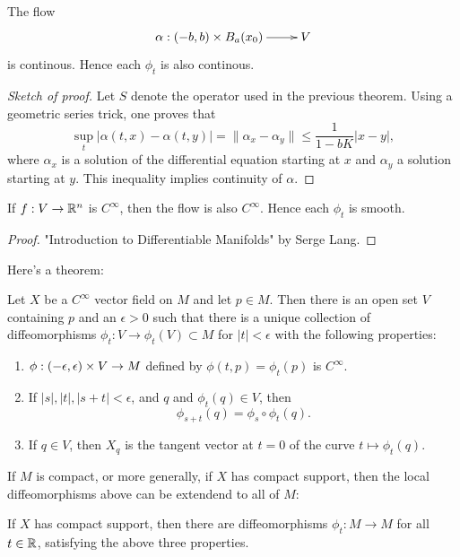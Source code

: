 \documentclass[11pt, english]{article}
\begin{document}
\begin{thm}
The flow
\[
\xymatrix@R=3pt{
\alpha:(-b,b) \times B_a(x_0) \ar[r] &  V
}
\]
is continous. Hence each $\phi_t$ is also continous. 
\end{thm}
\begin{proof}[Sketch of proof]
Let $S$ denote the operator used in the previous theorem. Using a geometric series trick, one proves that 
\[
\sup_t |\alpha(t,x)-\alpha(t,y)| = \| \alpha_x - \alpha_y \| \leq \frac{1}{1-bK} |x-y|,
\]
where $\alpha_x$ is a solution of the differential equation starting at $x$ and $\alpha_y$ a solution starting at $y$. This inequality implies continuity of $\alpha$.
\end{proof}

\begin{prop}
If $f: V \to \mathbb{R}^n$ is $C^\infty$, then the flow is also $C^\infty$. Hence each $\phi_t$ is smooth.
\end{prop}
\begin{proof}"Introduction to Differentiable Manifolds" by Serge Lang.
\end{proof}


Here's a theorem:
\begin{thm}
Let $X$ be a $C^\infty$ vector field on $M$ and let $p \in M$. Then there is an open set $V$ containing $p$ and an $\epsilon > 0$ such that there is a unique collection of diffeomorphisms $\phi_t: V \to \phi_t(V) \subset M$ for $|t| < \epsilon$ with the following properties:
\begin{enumerate}
\item $\phi:(-\epsilon,\epsilon) \times V \to M$ defined by $\phi(t,p)=\phi_t(p)$ is $C^\infty$.
\item If $|s|,|t|,|s+t| < \epsilon$, and $q$ and $\phi_t(q) \in V$, then
\[
\phi_{s+t}(q) = \phi_s \circ \phi_t(q).
\]
\item If $q \in V$, then $X_q$ is the tangent vector at $t=0$ of the curve $t \mapsto \phi_t(q)$.
\end{enumerate}
\end{thm}

If $M$ is compact, or more generally, if $X$ has compact support, then the local diffeomorphisms above can be extendend to all of $M$:

\begin{thm}
If $X$ has compact support, then there are diffeomorphisms $\phi_t:M \to M$ for all $t \in \mathbb{R}$, satisfying the above three properties.
\end{thm}
\end{document}
